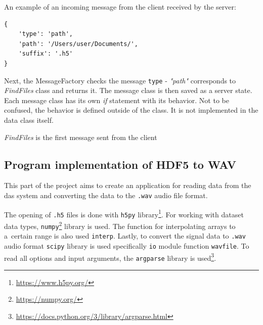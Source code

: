 An example of an incoming message from the client received by the server:
\begin{verbatim}
{
    'type': 'path',
    'path': '/Users/user/Documents/',
    'suffix': '.h5'
}
\end{verbatim}

Next, the MessageFactory checks the message \verb|type| - \textit{"path"} corresponds to \textit{FindFiles} class and returns it. The message class is then saved as a server state. Each message class has its own \textit{if} statement with its behavior. Not to be confused, the behavior is defined outside of the class. It is not implemented in the data class itself.

\textit{FindFiles} is the first message sent from the client 

\subsection{Program implementation of HDF5 to WAV}\label{lab:hdftowav}\label{txt.implementation.wav}

This part of the project aims to create an application for reading data from the \ac{das} system and converting the data to the \verb|.wav| audio file format.

The opening of \verb |.h5| files is done with \verb|h5py| library\footnote{\url{https://www.h5py.org/}}. For working with dataset data types, \verb|numpy|\footnote{\url{https://numpy.org/}} library is used. The function for interpolating arrays to a~certain range is also used \verb|interp|. Lastly, to convert the signal data to \verb|.wav| audio format \verb|scipy| library is used specifically \verb|io| module function \verb|wavfile|. To read all options and input arguments, the \verb|argparse| library is used\footnote{\url{https://docs.python.org/3/library/argparse.html}}.

